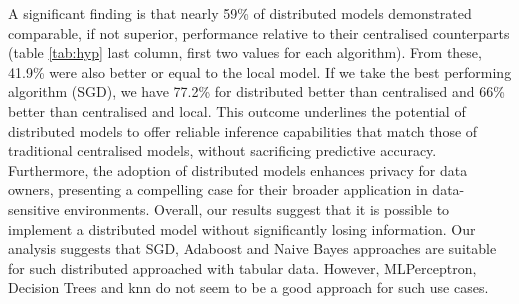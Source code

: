 


A significant finding is that nearly 59\% of distributed models demonstrated comparable, if not superior, performance relative to their centralised counterparts (table \ref{tab:hyp} last column, first two values for each algorithm). From these, 41.9\% were also better or equal to the local model. If we take the best performing algorithm (SGD), we have 77.2\% for distributed better than centralised and 66\% better than centralised and local. This outcome underlines the potential of distributed models to offer reliable inference capabilities that match those of traditional centralised models, without sacrificing predictive accuracy. Furthermore, the adoption of distributed models enhances privacy for data owners, presenting a compelling case for their broader application in data-sensitive environments. Overall, our results suggest that it is possible to implement a distributed model without significantly losing information. Our analysis suggests that SGD, Adaboost and Naive Bayes approaches are suitable for such distributed approached with tabular data. However, MLPerceptron, Decision Trees and \ac{knn} do not seem to be a good approach for such use cases.

